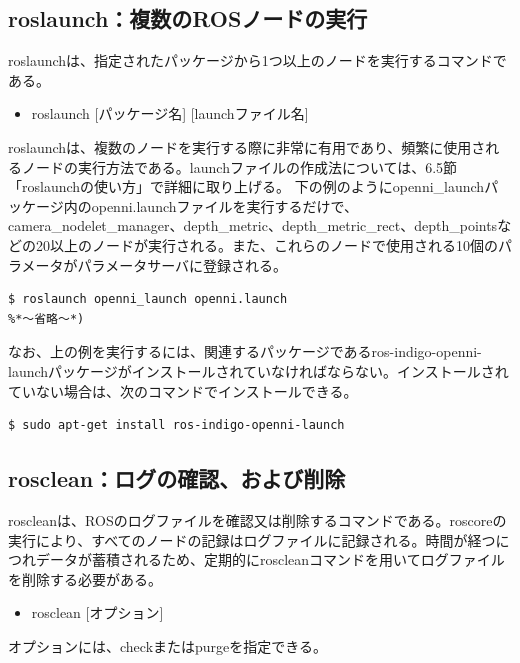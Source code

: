 \subsection{roslaunch：複数のROSノードの実行}

roslaunchは、指定されたパッケージから1つ以上のノードを実行するコマンドである。\\

\begin{itemize}
\item   roslaunch [パッケージ名] [launchファイル名]\\
\end{itemize}

roslaunchは、複数のノードを実行する際に非常に有用であり、頻繁に使用されるノードの実行方法である。launchファイルの作成法については、6.5節「roslaunchの使い方」で詳細に取り上げる。
下の例のようにopenni\_launchパッケージ内のopenni.launchファイルを実行するだけで、camera\_nodelet\_manager、depth\_metric、depth\_metric\_rect、depth\_pointsなどの20以上のノードが実行される。また、これらのノードで使用される10個のパラメータがパラメータサーバに登録される。

\begin{lstlisting}[language=ROS]
$ roslaunch openni_launch openni.launch
%*〜省略〜*)
\end{lstlisting}

なお、上の例を実行するには、関連するパッケージであるros-indigo-openni-launchパッケージがインストールされていなければならない。インストールされていない場合は、次のコマンドでインストールできる。

\begin{lstlisting}[language=ROS]
$ sudo apt-get install ros-indigo-openni-launch
\end{lstlisting}

\subsection{rosclean：ログの確認、および削除}

roscleanは、ROSのログファイルを確認又は削除するコマンドである。roscoreの実行により、すべてのノードの記録はログファイルに記録される。時間が経つにつれデータが蓄積されるため、定期的にroscleanコマンドを用いてログファイルを削除する必要がある。\\

\begin{itemize}
\item  rosclean [オプション]\\
\end{itemize}
オプションには、checkまたはpurgeを指定できる。

